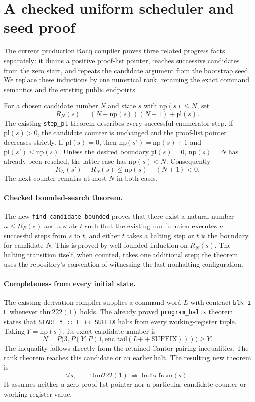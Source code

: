 \section{A checked uniform scheduler and seed proof}
\label{sec:seed-rank}

The current production Rocq compiler proves three related progress facts
separately: it drains a positive proof-list pointer, reaches successive
candidates from the zero start, and repeats the candidate argument from the
bootstrap seed.  We replace these inductions by one numerical rank, retaining
the exact command semantics and the existing public endpoints.

For a chosen candidate number $N$ and state $s$ with $\mathrm{np}(s)\leq N$, set
\[
 R_N(s)=(N-\mathrm{np}(s))(N+1)+\mathrm{pl}(s).
\]
The existing \texttt{step\_pl} theorem describes every successful enumerator
step.  If $\mathrm{pl}(s)>0$, the candidate counter is unchanged and the
proof-list pointer decreases strictly.  If $\mathrm{pl}(s)=0$, then
$\mathrm{np}(s')=\mathrm{np}(s)+1$ and
$\mathrm{pl}(s')\leq\mathrm{np}(s)$.  Unless the desired boundary
$\mathrm{pl}(s)=0$, $\mathrm{np}(s)=N$ has already been reached, the latter
case has $\mathrm{np}(s)<N$.  Consequently
\[
 R_N(s')-R_N(s)
 \leq \mathrm{np}(s)-(N+1)<0.
\]
The next counter remains at most $N$ in both cases.

\paragraph{Checked bounded-search theorem.}
The new \texttt{find\_candidate\_bounded} proves that there exist a natural
number $n\leq R_N(s)$ and a state $t$ such that the existing run function
executes $n$ successful steps from $s$ to $t$, and either $t$ takes a halting
step or $t$ is the boundary for candidate $N$.  This is proved by well-founded
induction on $R_N(s)$.  The halting transition itself, when counted, takes one
additional step; the theorem uses the repository's convention of witnessing
the last nonhalting configuration.

\paragraph{Completeness from every initial state.}
The existing derivation compiler supplies a command word $L$ with contract
\texttt{blk 1 L} whenever $\mathrm{thm222}(1)$ holds.  The already proved
\texttt{program\_halts} theorem states that
\texttt{START Y :: L ++ SUFFIX} halts from every working-register tuple.
Taking $Y=\mathrm{np}(s)$, its exact candidate number is
\[
 N=P\bigl(3,P(Y,P(1,\mathrm{enc\_tail}(L\mathbin{+\!+}\mathrm{SUFFIX})))\bigr)
 \geq Y.
\]
The inequality follows directly from the retained Cantor-pairing inequalities.
The rank theorem reaches this candidate or an earlier halt.  The resulting
new theorem is
\[
 \forall s,\qquad
 \mathrm{thm222}(1)\ \Longrightarrow\ \mathrm{halts\_from}(s).
\]
It assumes neither a zero proof-list pointer nor a particular candidate
counter or working-register value.

